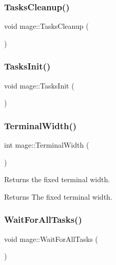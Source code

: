\hypertarget{namespacemage_a118ddaa5d9606328a0af412c85832e6b}{}\label{namespacemage_a118ddaa5d9606328a0af412c85832e6b} 
\subsubsection{\texorpdfstring{Tasks\+Cleanup()}{TasksCleanup()}}
{\footnotesize\ttfamily void mage\+::\+Tasks\+Cleanup (\begin{DoxyParamCaption}{ }\end{DoxyParamCaption})}

\hypertarget{namespacemage_a8252f7acebefd3efe34a15cc51e4a7ac}{}\label{namespacemage_a8252f7acebefd3efe34a15cc51e4a7ac} 
\subsubsection{\texorpdfstring{Tasks\+Init()}{TasksInit()}}
{\footnotesize\ttfamily void mage\+::\+Tasks\+Init (\begin{DoxyParamCaption}{ }\end{DoxyParamCaption})}

\hypertarget{namespacemage_a0c12a51bf3468b372932ffc1138a4ddc}{}\label{namespacemage_a0c12a51bf3468b372932ffc1138a4ddc} 
\subsubsection{\texorpdfstring{Terminal\+Width()}{TerminalWidth()}}
{\footnotesize\ttfamily int mage\+::\+Terminal\+Width (\begin{DoxyParamCaption}{ }\end{DoxyParamCaption})}

Returns the fixed terminal width.

\begin{DoxyReturn}{Returns}
The fixed terminal width. 
\end{DoxyReturn}
\hypertarget{namespacemage_a7da78c39175a029c92ed42d8fb9f30af}{}\label{namespacemage_a7da78c39175a029c92ed42d8fb9f30af} 
\subsubsection{\texorpdfstring{Wait\+For\+All\+Tasks()}{WaitForAllTasks()}}
{\footnotesize\ttfamily void mage\+::\+Wait\+For\+All\+Tasks (\begin{DoxyParamCaption}{ }\end{DoxyParamCaption})}

